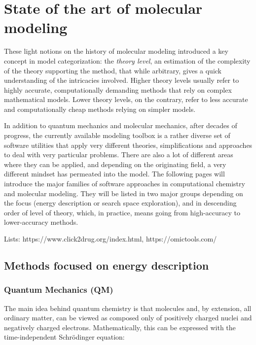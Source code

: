 
\section{State of the art of molecular modeling }
These light notions on the history of molecular modeling introduced a key concept in model categorization: the \textit{theory level}, an estimation of the complexity of the theory supporting the method, that while arbitrary, gives a quick understanding of the intricacies involved. Higher theory levels usually refer to highly accurate, computationally demanding methods that rely on complex mathematical models. Lower theory levels, on the contrary, refer to less accurate and computationally cheap methods relying on simpler models.

In addition to quantum mechanics and molecular mechanics, after decades of progress, the currently available modeling toolbox is a rather diverse set of software utilities that apply very different theories, simplifications and approaches to deal with very particular problems. There are also a lot of different areas where they can be applied, and depending on the originating field, a very different mindset has permeated into the model. The following pages will introduce the major families of software approaches in computational chemistry and molecular modeling. They will be listed in two major groups depending on the focus (energy description or search space exploration), and in descending order of level of theory, which, in practice, means going from high-accuracy to lower-accuracy methods.

Lists: https://www.click2drug.org/index.html, https://omictools.com/

\subsection{Methods focused on energy description}
\subsubsection{Quantum Mechanics (QM)}
The main idea behind quantum chemistry is that molecules and, by extension, all ordinary matter, can be viewed as composed only of positively charged nuclei and negatively charged electrons. Mathematically, this can be expressed with the time-independent Schrödinger equation:

